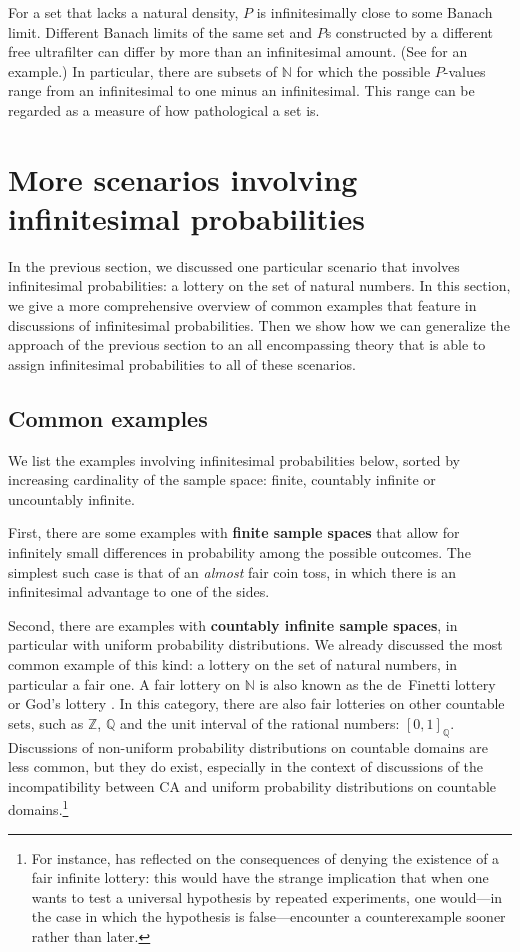 For a set that lacks a natural density, $P$ is infinitesimally close to some Banach limit. Different Banach limits of the same set and $P$s constructed by a different free ultrafilter can differ by more than an infinitesimal amount. (See \citealt{KerkvlietMeester:2016} for an example.) In particular, there are subsets of $\mathbb{N}$ for which the possible $P$-values range from an infinitesimal to one minus an infinitesimal. This range can be regarded as a measure of how pathological a set is.


\section{More scenarios involving infinitesimal probabilities}\label{sec:more}
In the previous section, we discussed one particular scenario that involves infinitesimal probabilities: a lottery on the set of natural numbers. In this section, we give a more comprehensive overview of common examples that feature in discussions of infinitesimal probabilities. Then we show how we can generalize the approach of the previous section to an all encompassing theory that is able to assign infinitesimal probabilities to all of these scenarios.

\subsection{Common examples}
We list the examples involving infinitesimal probabilities below, sorted by increasing cardinality of the sample space: finite, countably infinite or uncountably infinite.

First, there are some examples with \textbf{finite sample spaces} that allow for infinitely small differences in probability among the possible outcomes. The simplest such case is that of an \emph{almost} fair coin toss, in which there is an infinitesimal advantage to one of the sides.

Second, there are examples with \textbf{countably infinite sample spaces}, in particular with uniform probability distributions.
We already discussed the most common example of this kind: a lottery on the set of natural numbers, in particular a fair one. A fair lottery on $\mathbb{N}$ is also known as the de~Finetti lottery \citep{Bartha:2004} or God's lottery \citep{McCallArmstrong:1989}.
In this category, there are also fair lotteries on other countable sets, such as $\mathbb{Z}$, $\mathbb{Q}$ and the unit interval of the rational numbers: $[0,1]_\mathbb{Q}$.
Discussions of non-uniform probability distributions on countable domains are less common, but they do exist, especially in the context of discussions of the incompatibility between CA and uniform probability distributions on countable domains.\footnote{For instance, \citet{Kelly:1996} has reflected on the consequences of denying the existence of a fair infinite lottery: this would have the strange implication that when one wants to test a universal hypothesis by repeated experiments, one would---in the case in which the hypothesis is false---encounter a counterexample sooner rather than later.}

